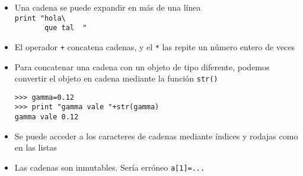 \documentclass[ucs]{beamer}
\begin{document}

\begin{frame}[fragile]
\begin{itemize}

\item 
Una cadena se puede expandir en más de una línea\\
\verb|print "hola\  |  \\
\verb|       que tal  "|  

\item El operador \verb|+| concatena cadenas, y el \verb|*| las repite
  un número entero de veces
\item
Para concatenar una cadena con un objeto de tipo diferente, podemos
convertir el objeto en cadena mediante la función \verb|str()|

  \begin{footnotesize}
  \begin{verbatim}
>>> gamma=0.12
>>> print "gamma vale "+str(gamma)
gamma vale 0.12
  \end{verbatim}
  \end{footnotesize}

\item Se puede acceder a los caracteres de cadenas mediante índices y
  rodajas como en las listas
\item
Las cadenas son inmutables. Sería erróneo \verb|a[1]=...|
\end{itemize}
\end{frame}








%
\end{document}
